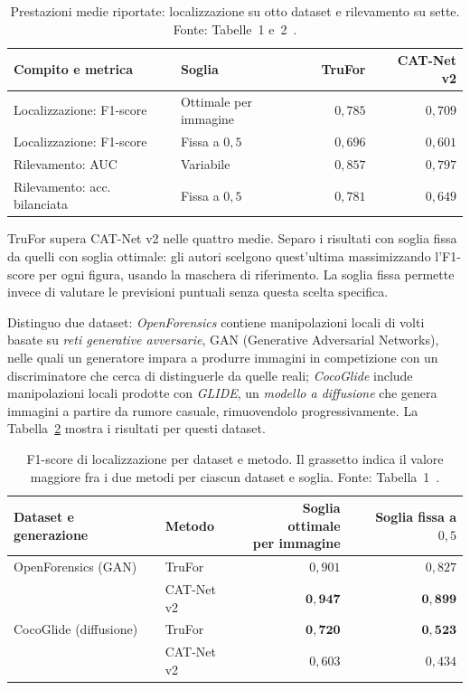 \begin{table}[htbp]
    \centering
    \small
    \caption{Prestazioni medie riportate: localizzazione su otto dataset e rilevamento su sette. Fonte: Tabelle~1 e~2~\cite{Guillaro_2023_CVPR}.}
    \label{tab:trufor-medie}
    \begin{tabular}{@{}llrr@{}}
        \toprule
        Compito e metrica & Soglia & TruFor & CAT-Net v2 \\
        \midrule
        Localizzazione: F1-score & Ottimale per immagine & $0{,}785$ & $0{,}709$ \\
        Localizzazione: F1-score & Fissa a $0{,}5$ & $0{,}696$ & $0{,}601$ \\
        Rilevamento: AUC & Variabile & $0{,}857$ & $0{,}797$ \\
        Rilevamento: acc. bilanciata & Fissa a $0{,}5$ & $0{,}781$ & $0{,}649$ \\
        \bottomrule
    \end{tabular}
\end{table}

TruFor supera CAT-Net v2 nelle quattro medie. Separo i risultati con soglia fissa da quelli con soglia ottimale: gli autori scelgono quest'ultima massimizzando l'F1-score per ogni figura, usando la maschera di riferimento. La soglia fissa permette invece di valutare le previsioni puntuali senza questa scelta specifica.

Distinguo due dataset: \emph{OpenForensics} contiene manipolazioni locali di volti basate su \emph{reti generative avversarie}, GAN (Generative Adversarial Networks), nelle quali un generatore impara a produrre immagini in competizione con un discriminatore che cerca di distinguerle da quelle reali; \emph{CocoGlide} include manipolazioni locali prodotte con \emph{GLIDE}, un \emph{modello a diffusione} che genera immagini a partire da rumore casuale, rimuovendolo progressivamente. La Tabella~\ref{tab:trufor-generative} mostra i risultati per questi dataset.

\begin{table}[htbp]
    \centering
    \small
    \caption{F1-score di localizzazione per dataset e metodo. Il grassetto indica il valore maggiore fra i due metodi per ciascun dataset e soglia. Fonte: Tabella~1~\cite{Guillaro_2023_CVPR}.}
    \label{tab:trufor-generative}
    \begin{tabular}{@{}llrr@{}}
        \toprule
        Dataset e generazione & Metodo & \shortstack{Soglia ottimale\\per immagine} & \shortstack{Soglia fissa\\a $0{,}5$} \\
        \midrule
        OpenForensics (GAN) & TruFor & $0{,}901$ & $0{,}827$ \\
                            & CAT-Net v2 & $\mathbf{0{,}947}$ & $\mathbf{0{,}899}$ \\
        \addlinespace
        CocoGlide (diffusione) & TruFor & $\mathbf{0{,}720}$ & $\mathbf{0{,}523}$ \\
                              & CAT-Net v2 & $0{,}603$ & $0{,}434$ \\
        \bottomrule
    \end{tabular}
\end{table}


